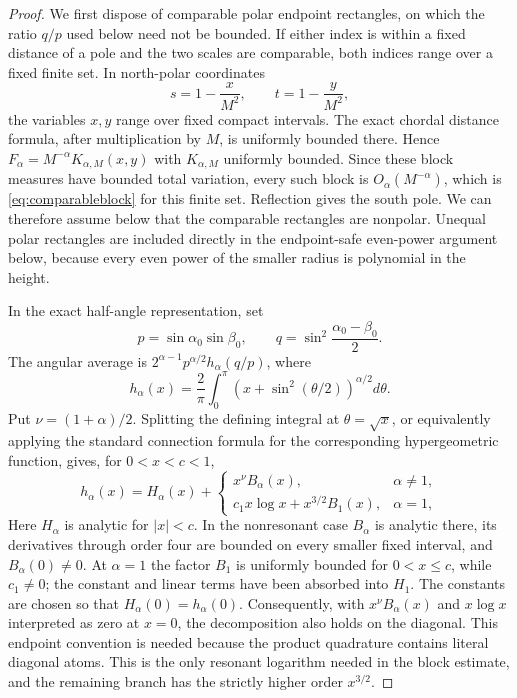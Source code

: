 \documentclass[11pt]{amsart}
\begin{document}
\begin{proof}
We first dispose of comparable polar endpoint rectangles, on which the ratio
$q/p$ used below need not be bounded.  If either index is within a fixed
distance of a pole and the two scales are comparable, both indices range
over a fixed finite set.  In north-polar coordinates
\[
 s=1-\frac{x}{M^2},\qquad t=1-\frac{y}{M^2},
\]
the variables $x,y$ range over fixed compact intervals.  The exact chordal
distance formula, after multiplication by $M$, is uniformly bounded there.
Hence $F_\alpha=M^{-\alpha}K_{\alpha,M}(x,y)$ with $K_{\alpha,M}$ uniformly
bounded.  Since these block measures have bounded total variation, every
such block is $O_\alpha(M^{-\alpha})$, which is
\eqref{eq:comparableblock} for this finite set.  Reflection gives the south
pole.  We can therefore assume below that the comparable rectangles are
nonpolar.  Unequal polar rectangles are included directly in the
endpoint-safe even-power argument below, because every even power of the
smaller radius is polynomial in the height.

In the exact half-angle representation, set
\[
 p=\sin\alpha_0\sin\beta_0,\qquad
 q=\sin^2\frac{\alpha_0-\beta_0}{2}.
\]
The angular average is $2^{\alpha-1}p^{\alpha/2}h_\alpha(q/p)$, where
\[
 h_\alpha(x)=\frac2\pi\int_0^\pi
 (x+\sin^2(\theta/2))^{\alpha/2}d\theta.
\]
Put $\nu=(1+\alpha)/2$.  Splitting the defining integral at
$\theta=\sqrt x$, or equivalently applying the standard connection formula
for the corresponding hypergeometric function, gives, for $0<x<c<1$,
\begin{equation}\label{eq:hexpalpha}
 h_\alpha(x)=H_\alpha(x)+
 \begin{cases}
 x^\nu B_\alpha(x),&\alpha\ne1,\\
 c_1x\log x+x^{3/2}B_1(x),&\alpha=1,
 \end{cases}                                         \tag{5.5}
\end{equation}
Here $H_\alpha$ is analytic for $|x|<c$.  In the nonresonant case
$B_\alpha$ is analytic there, its derivatives through order four are
bounded on every smaller fixed interval, and $B_\alpha(0)\ne0$.  At
$\alpha=1$ the factor $B_1$ is uniformly bounded for $0<x\le c$, while
$c_1\ne0$; the constant and linear terms have been absorbed into $H_1$.
The constants are chosen so that $H_\alpha(0)=h_\alpha(0)$.  Consequently,
with $x^\nu B_\alpha(x)$ and $x\log x$ interpreted as zero at $x=0$, the
decomposition also holds on the diagonal.  This endpoint convention is
needed because the product quadrature contains literal diagonal atoms.
This is the only resonant logarithm needed in the block estimate, and the
remaining branch has the strictly higher order $x^{3/2}$.


\end{proof}
\end{document}
